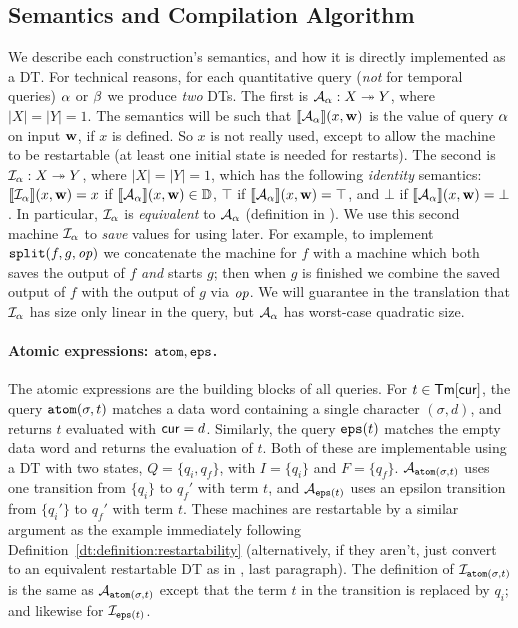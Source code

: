 \subsection{Semantics and Compilation Algorithm}
\label{dt:subsec:rm-compilation}

We describe each construction's semantics, and how it is directly implemented as a DT.
For technical reasons, for each quantitative query (\emph{not} for temporal queries) $\alpha$ or $\beta$ we produce \emph{two} DTs. The first is $\mathcal{A}_{\alpha}: X \twoheadrightarrow Y$, where $|X| = |Y| = 1$. The semantics will be such that $\llbracket \mathcal{A}_{\alpha} \rrbracket(x,\mathbf{w})$ is the value of query $\alpha$ on input $\mathbf{w}$, if $x$ is defined. So $x$ is not really used, except to allow the machine to be restartable (at least one initial state is needed for restarts). The second is $\mathcal{I}_{\alpha}: X \twoheadrightarrow Y$, where $|X|=|Y|=1$, which has the following \emph{identity} semantics: $\llbracket \mathcal{I}_{\alpha} \rrbracket(x,\mathbf{w}) = x$ if $\llbracket \mathcal{A}_{\alpha} \rrbracket(x,\mathbf{w}) \in \mathbb{D}$, $\top$ if $\llbracket \mathcal{A}_{\alpha} \rrbracket(x,\mathbf{w}) = \top$, and $\bot$ if $\llbracket \mathcal{A}_{\alpha} \rrbracket(x,\mathbf{w}) = \bot$.
In particular, $\mathcal{I}_{\alpha}$ is \emph{equivalent} to $\mathcal{A}_{\alpha}$ (definition in ).
We use this second machine $\mathcal{I}_{\alpha}$ to \emph{save} values for using later. For example, to implement $\texttt{split}(f,g,\mathit{op})$ we concatenate the machine for $f$ with a machine which both saves the output of $f$ \emph{and} starts $g$; then when $g$ is finished we combine the saved output of $f$ with the output of $g$ via $\mathit{op}$. We will guarantee in the translation that $\mathcal{I}_{\alpha}$ has size only linear in the query, but $\mathcal{A}_{\alpha}$ has worst-case quadratic size.

\paragraph*{Atomic expressions: $\texttt{atom}, \texttt{eps}$.}
The atomic expressions are the building blocks of all queries. For $t \in \textsf{Tm}[\mathsf{cur}]$, the query $\texttt{atom}(\sigma, t)$ matches a data word containing a single character $(\sigma, d)$, and returns $t$ evaluated with $\mathsf{cur} = d$. Similarly, the query $\texttt{eps}(t)$ matches the empty data word and returns the evaluation of $t$.
Both of these are implementable using a DT with two states, $Q = \{q_i, q_f\}$, with $I = \{q_i\}$ and $F = \{q_f\}$.
$\mathcal{A}_{\texttt{atom}(\sigma, t)}$ uses one transition from $\{q_i\}$ to $q_f'$ with term $t$, and $\mathcal{A}_{\texttt{eps}(t)}$ uses an epsilon transition from $\{q_i'\}$ to $q_f'$ with term $t$.
These machines are restartable by a similar argument as the example immediately following Definition~\ref{dt:definition:restartability} (alternatively, if they aren't, just convert to an equivalent restartable DT as in , last paragraph).
The definition of $\mathcal{I}_{\texttt{atom}(\sigma, t)}$ is the same as $\mathcal{A}_{\texttt{atom}(\sigma, t)}$ except that the term $t$ in the transition is replaced by $q_i$; and likewise for $\mathcal{I}_{\texttt{eps}(t)}$.

